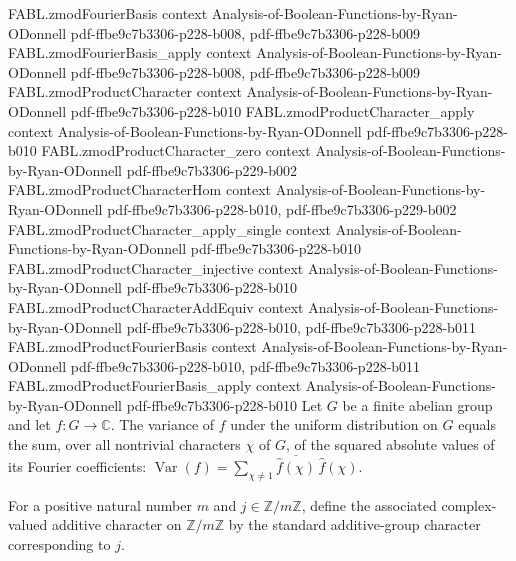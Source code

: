 \begin{theorem}
\proofstep
  {FABL.zmodFourierBasis}
  {context}
  {Analysis-of-Boolean-Functions-by-Ryan-ODonnell}
  {pdf-ffbe9c7b3306-p228-b008,
    pdf-ffbe9c7b3306-p228-b009}
\proofstep
  {FABL.zmodFourierBasis_apply}
  {context}
  {Analysis-of-Boolean-Functions-by-Ryan-ODonnell}
  {pdf-ffbe9c7b3306-p228-b008,
    pdf-ffbe9c7b3306-p228-b009}
\proofstep
  {FABL.zmodProductCharacter}
  {context}
  {Analysis-of-Boolean-Functions-by-Ryan-ODonnell}
  {pdf-ffbe9c7b3306-p228-b010}
\proofstep
  {FABL.zmodProductCharacter_apply}
  {context}
  {Analysis-of-Boolean-Functions-by-Ryan-ODonnell}
  {pdf-ffbe9c7b3306-p228-b010}
\proofstep
  {FABL.zmodProductCharacter_zero}
  {context}
  {Analysis-of-Boolean-Functions-by-Ryan-ODonnell}
  {pdf-ffbe9c7b3306-p229-b002}
\proofstep
  {FABL.zmodProductCharacterHom}
  {context}
  {Analysis-of-Boolean-Functions-by-Ryan-ODonnell}
  {pdf-ffbe9c7b3306-p228-b010,
    pdf-ffbe9c7b3306-p229-b002}
\proofstep
  {FABL.zmodProductCharacter_apply_single}
  {context}
  {Analysis-of-Boolean-Functions-by-Ryan-ODonnell}
  {pdf-ffbe9c7b3306-p228-b010}
\proofstep
  {FABL.zmodProductCharacter_injective}
  {context}
  {Analysis-of-Boolean-Functions-by-Ryan-ODonnell}
  {pdf-ffbe9c7b3306-p228-b010}
\proofstep
  {FABL.zmodProductCharacterAddEquiv}
  {context}
  {Analysis-of-Boolean-Functions-by-Ryan-ODonnell}
  {pdf-ffbe9c7b3306-p228-b010,
    pdf-ffbe9c7b3306-p228-b011}
\proofstep
  {FABL.zmodProductFourierBasis}
  {context}
  {Analysis-of-Boolean-Functions-by-Ryan-ODonnell}
  {pdf-ffbe9c7b3306-p228-b010,
    pdf-ffbe9c7b3306-p228-b011}
\proofstep
  {FABL.zmodProductFourierBasis_apply}
  {context}
  {Analysis-of-Boolean-Functions-by-Ryan-ODonnell}
  {pdf-ffbe9c7b3306-p228-b010}
Let $G$ be a finite abelian group and let $f:G\to\mathbb{C}$. The variance of $f$ under
the uniform distribution on $G$ equals the sum, over all nontrivial characters $\chi$ of
$G$, of the squared absolute values of its Fourier coefficients:
$\operatorname{Var}(f)=\sum_{\chi\ne 1}\overline{\widehat f(\chi)}\,\widehat f(\chi)$.
\end{theorem}

\begin{definition}
\label{FABL.zmodCharacter}
\leanok
{}
For a positive natural number $m$ and $j\in\mathbb{Z}/m\mathbb{Z}$, define the
associated complex-valued additive character on $\mathbb{Z}/m\mathbb{Z}$ by the standard
additive-group character corresponding to $j$.
\end{definition}

